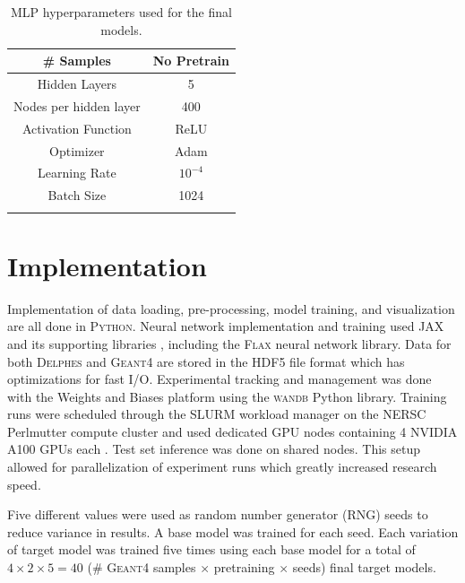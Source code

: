 \begin{table}[]
\centering
    \begin{tabular}{c|c}
    \hhline{==}
    \# Samples & No Pretrain \\ \hline
    Hidden Layers & 5 \\
    Nodes per hidden layer & 400 \\
    Activation Function & ReLU \\
    Optimizer & Adam \cite{kingma2017adam} \\
    Learning Rate & $10^{-4}$ \\
    Batch Size & 1024 \\
    \hhline{==}
    \end{tabular}
    \caption{MLP hyperparameters used for the final models.}
    \label{tab:hyperparams}
\end{table}

\section{Implementation}

Implementation of data loading, pre-processing, model training, and visualization are all done in \textsc{Python}. Neural network implementation and training used \textsc{JAX} \cite{jax2018github} and its supporting libraries \cite{deepmind2020jax}, including the \textsc{Flax} \cite{flax2020github} neural network library. Data for both \textsc{Delphes} and \textsc{Geant4} are stored in the \textsc{HDF5} file format which has optimizations for fast I/O. Experimental tracking and management was done with the Weights and Biases \cite{wandb} platform using the \textsc{wandb} Python library. Training runs were scheduled through the SLURM \cite{10.1007/10968987_3} workload manager on the NERSC Perlmutter compute cluster and used dedicated GPU nodes containing 4 NVIDIA A100 GPUs each \cite{perlmutter}. Test set inference was done on shared nodes. This setup allowed for parallelization of experiment runs which greatly increased research speed.

Five different values were used as random number generator (RNG) seeds to reduce variance in results. A base model was trained for each seed. Each variation of target model was trained five times using each base model for a total of $4 \times 2 \times 5 = 40$ (\# \textsc{Geant4} samples $\times$ pretraining $\times$ seeds) final target models.
